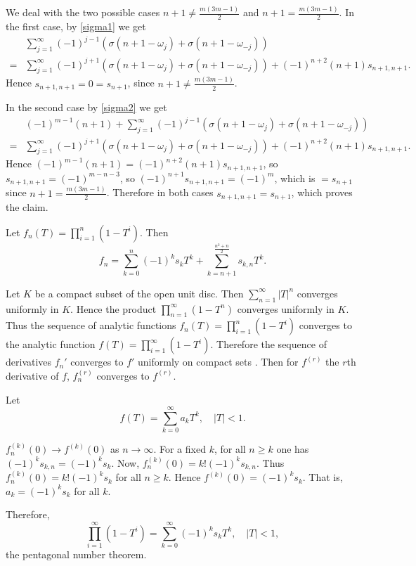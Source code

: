 \documentclass{amsart}
\begin{document}
We deal with the two possible cases $n+1\neq \frac{m(3m-1)}{2}$ and
$n+1=\frac{m(3m-1)}{2}$. In the first case,
by \eqref{sigma1} we get
\[
\begin{split}
&\sum_{j=1}^\infty (-1)^{j-1}(\sigma(n+1-\omega_j)+\sigma(n+1-\omega_{-j}))\\
=&\sum_{j=1}^\infty (-1)^{j+1}(\sigma(n+1-\omega_j)
+\sigma(n+1-\omega_{-j}))+(-1)^{n+2}(n+1)s_{n+1,n+1}.
\end{split}
\]
Hence $s_{n+1,n+1}=0=s_{n+1}$, since $n+1 \neq \frac{m(3m-1)}{2}$.

In the second case by \eqref{sigma2} we get
\[
\begin{split}
&(-1)^{m-1}(n+1)+\sum_{j=1}^\infty (-1)^{j-1}(\sigma(n+1-\omega_j)+
\sigma(n+1-\omega_{-j}))\\
=&\sum_{j=1}^\infty (-1)^{j+1}(\sigma(n+1-\omega_j)
+\sigma(n+1-\omega_{-j}))+(-1)^{n+2}(n+1)s_{n+1,n+1}.
\end{split}
\]
Hence $(-1)^{m-1}(n+1)=(-1)^{n+2}(n+1)s_{n+1,n+1}$, so
$s_{n+1,n+1}=(-1)^{m-n-3}$, so $(-1)^{n+1}s_{n+1,n+1}=(-1)^m$,
which is $=s_{n+1}$ since $n+1=\frac{m(3m-1)}{2}$.
Therefore in both cases $s_{n+1,n+1}=s_{n+1}$, which proves the claim.

Let $f_n(T)=\prod_{i=1}^n (1-T^i)$. Then
\[
f_n=\sum_{k=0}^n (-1)^k s_k T^k + \sum_{k=n+1}^{\frac{n^2+n}{2}} s_{k,n}T^k.
\]  

Let $K$ be a compact subset of the open unit disc.
Then $\sum_{n=1}^\infty |T|^n$ converges uniformly
in $K$. Hence \cite[Chap. V, \S 3.1]{cartan}
the product $\prod_{n=1}^\infty (1-T^n)$ converges uniformly in $K$.
Thus \cite[Chap. V, \S 1.2, Theorem 1]{cartan} the sequence of analytic functions $f_n(T)=\prod_{i=1}^n (1-T^i)$
converges to the analytic function $f(T)=\prod_{i=1}^\infty (1-T^i)$.
Therefore the sequence of derivatives $f_n'$ converges to $f'$ uniformly
on compact sets \cite[Chap. V, \S 1.2, Theorem 2]{cartan}. 
Then for $f^{(r)}$ the $r$th derivative of $f$, $f_n^{(r)}$ converges to
$f^{(r)}$.

Let
\[
f(T)=\sum_{k=0}^\infty a_kT^k, \quad |T|<1.
\]

$f_n^{(k)}(0) \to f^{(k)}(0)$ as $n \to \infty$.
For a fixed $k$, for all $n \geq k$ one has $(-1)^ks_{k,n}=(-1)^ks_k$.
Now, $f_n^{(k)}(0)=k!(-1)^ks_{k,n}$. Thus
$f_n^{(k)}(0)=k!(-1)^ks_k$ for all $n \geq k$. Hence $f^{(k)}(0)=(-1)^ks_k$. That is,
$a_k=(-1)^ks_k$ for all $k$.

Therefore,
\[
\prod_{i=1}^\infty (1-T^i)=\sum_{k=0}^\infty (-1)^k s_k T^k, \quad |T|<1,
\]
the pentagonal number theorem.
\end{document}
